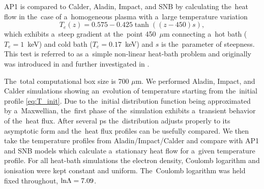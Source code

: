 AP1 is compared to Calder, Aladin, Impact, and SNB by 
calculating the~heat flow in the~case of a~homogeneous plasma
with a~large temperature variation
\begin{equation}
  T_e(z) = 0.575 - 0.425 \tanh\left((z-450) s\right) ,
  \label{eq:T_init}
\end{equation}
which exhibits a~steep gradient at the~point 450~$\mu$m 
connecting a~hot bath ($T_e = 1$~keV) 
and cold bath ($T_e = 0.17$~keV) and $s$ is the~parameter of steepness. 
This test is referred to as a~simple non-linear heat-bath problem and
originally was introduced in \cite{marocchino2013} and further investigated
in  \cite{Sorbo_2015, Sorbo_2016, Sherlock_PoP2017, Brodrick_PoP2017}.


The~total computational box size is 700 $\mu$m.
We performed Aladin, Impact, and Calder simulations showing an~evolution of
temperature starting from the~initial profile \eqref{eq:T_init}. 
Due to the~initial distribution function being approximated by a~Maxwellian,
the~first phase of the~simulation exhibits a~transient behavior of the~heat
flux. After several ps the~distribution adjusts properly to its asymptotic form
and the~heat flux profiles can be usefully compared. 
We then take the temperature profiles from Aladin/Impact/Calder and compare 
with AP1 and SNB models which calculate a~stationary heat flow
for a~given temperature profile. 
For all heat-bath simulations the electron density, Coulomb logarithm and 
ionisation were kept constant and uniform.
The~Coulomb logarithm was held fixed throughout, $\text{ln}\Lambda = 7.09$.

